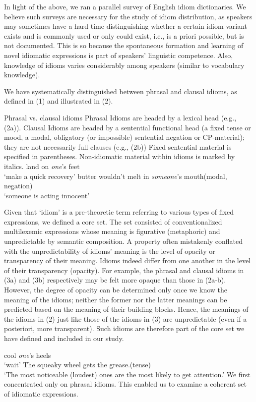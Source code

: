 \documentclass[output=paper,
modfonts
]{LSP/langsci}
\begin{document}
In light of the above, we ran a parallel survey of English idiom
dictionaries. We believe such surveys are necessary for the study of
idiom distribution, as speakers may sometimes have a hard time
distinguishing whether a certain idiom variant exists and is commonly
used or only could exist, i.e., is a priori possible, but is not
documented. This is so because the spontaneous formation and learning of
novel idiomatic expressions is part of speakers' linguistic competence.
Also, knowledge of idioms varies considerably among speakers (similar to
vocabulary knowledge).

We have systematically distinguished between phrasal and clausal idioms,
as defined in (1) and illustrated in (2).

\ea Phrasal vs. clausal idioms
	\ea Phrasal Idioms are headed by a lexical head (e.g., (2a)).
	\ex Clausal Idioms are headed by a sentential functional head (a fixed
	tense or mood, a modal, obligatory (or impossible) sentential negation
	or CP-material); they are not necessarily full clauses (e.g., (2b))
	\z
\z
Fixed sentential material is specified in parentheses. Non-idiomatic material within idioms is marked by italics.
\ea
	\ea land on \emph{one}'s feet\\
	`make a quick recovery'
	\ex butter wouldn't melt in \emph{someone}'s mouth\hfill (modal, negation)\\
	 `someone is acting innocent'
	\z
\z

Given that `idiom' is a pre-theoretic term referring to various types of
fixed expressions, we defined a core set. The set consisted of
conventionalized multilexemic expressions whose meaning is figurative
(metaphoric) and unpredictable by semantic composition. A property often
mistakenly conflated with the unpredictability of idioms' meaning is the
level of opacity or transparency of their meaning. Idioms indeed differ
from one another in the level of their transparency (opacity). For
example, the phrasal and clausal idioms in (3a) and (3b) respectively
may be felt more opaque than those in (2a-b). However, the degree of
opacity can be determined only once we know the meaning of the idioms;
neither the former nor the latter meanings can be predicted based on the
meaning of their building blocks. Hence, the meanings of the idioms in
(2) just like those of the idioms in (3) are unpredictable (even if a
posteriori, more transparent). Such idioms are therefore part of the
core set we have defined and included in our study.

\ea 
	\ea cool \emph{one}'s heels\\
	`wait'
	\ex The squeaky wheel gets the grease.\hfill(tense)\\
	`The most noticeable (loudest) ones are the most likely to get attention.'
	\z
\z
We first concentrated only on phrasal idioms. This enabled us to examine
a coherent set of idiomatic expressions.
\end{document}

